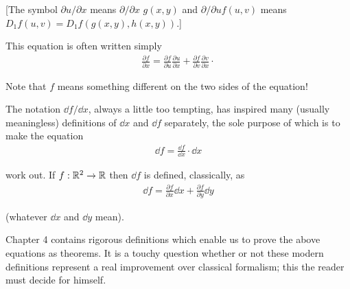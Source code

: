 [The symbol $\partial u/\partial x$ means $\partial/\partial x$ $g(x,y)$ 
and $\partial/\partial uf(u,v)$ means $D_1f(u,v)=D_1f(g(x,y),h(x,y))$.]

This equation is often written simply
\begin{align*}
    \frac{\partial f}{\partial x}
    =\frac{\partial f}{\partial u}\frac{\partial u}{\partial x}
        +\frac{\partial f}{\partial v}\frac{\partial v}{\partial x}\cdotp 
\end{align*}

Note that $f$ means something different on the two sides of the
equation!

The notation $\dd f/\dd x$, always a little too tempting, has inspired
many (usually meaningless) definitions of $\dd x$ and $\dd f$ separately,
the sole purpose of which is to make the equation
\begin{align*}
    \dd f=\frac{\dd f}{\dd x}\cdot \dd x
\end{align*}

work out. If $f:\mathbb{R}^2\to \mathbb{R}$ then $\dd f$ is defined, classically, as 
\begin{align*}
    \dd f=\frac{\partial f}{\partial x}\dd x+\frac{\partial f}{\partial y}\dd y
\end{align*}

(whatever $\dd x$ and $\dd y$ mean).

Chapter 4 contains rigorous definitions which enable us to
prove the above equations as theorems. It is a touchy
question whether or not these modern definitions represent a
real improvement over classical formalism; this the reader
must decide for himself.